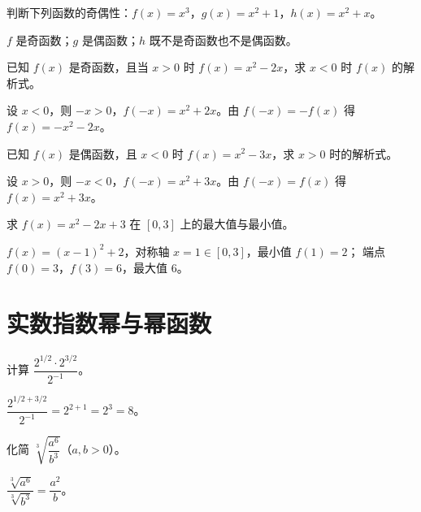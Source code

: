 \begin{problem}
判断下列函数的奇偶性：$f(x)=x^3$，$g(x)=x^2+1$，$h(x)=x^2+x$。
\end{problem}
\begin{solution}
$f$ 是奇函数；$g$ 是偶函数；$h$ 既不是奇函数也不是偶函数。
\end{solution}

\begin{problem}
已知 $f(x)$ 是奇函数，且当 $x>0$ 时 $f(x)=x^2-2x$，求 $x<0$ 时 $f(x)$ 的解析式。
\end{problem}
\begin{solution}
设 $x<0$，则 $-x>0$，$f(-x)=x^2+2x$。由 $f(-x)=-f(x)$ 得 $f(x)=-x^2-2x$。
\end{solution}

\begin{problem}
已知 $f(x)$ 是偶函数，且 $x<0$ 时 $f(x)=x^2-3x$，求 $x>0$ 时的解析式。
\end{problem}
\begin{solution}
设 $x>0$，则 $-x<0$，$f(-x)=x^2+3x$。由 $f(-x)=f(x)$ 得 $f(x)=x^2+3x$。
\end{solution}

\begin{problem}
求 $f(x)=x^2-2x+3$ 在 $[0,3]$ 上的最大值与最小值。
\end{problem}
\begin{solution}
$f(x)=(x-1)^2+2$，对称轴 $x=1\in[0,3]$，最小值 $f(1)=2$；
端点 $f(0)=3$，$f(3)=6$，最大值 $6$。
\end{solution}

\section{实数指数幂与幂函数}

\begin{problem}
计算 $\dfrac{2^{1/2}\cdot2^{3/2}}{2^{-1}}$。
\end{problem}
\begin{solution}
$\dfrac{2^{1/2+3/2}}{2^{-1}}=2^{2+1}=2^3=8$。
\end{solution}

\begin{problem}
化简 $\sqrt[3]{\dfrac{a^6}{b^3}}$（$a,b>0$）。
\end{problem}
\begin{solution}
$\dfrac{\sqrt[3]{a^6}}{\sqrt[3]{b^3}}=\dfrac{a^2}{b}$。
\end{solution}

